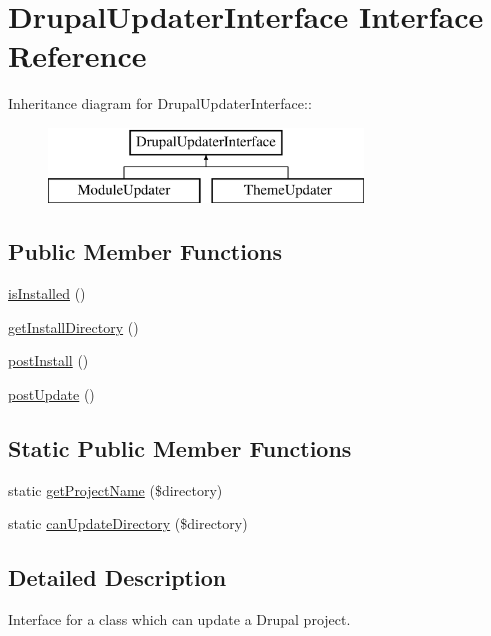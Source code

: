 \hypertarget{interfaceDrupalUpdaterInterface}{
\section{DrupalUpdaterInterface Interface Reference}
\label{interfaceDrupalUpdaterInterface}
}
Inheritance diagram for DrupalUpdaterInterface::\begin{figure}[H]
\begin{center}
\leavevmode
\includegraphics[height=2cm]{interfaceDrupalUpdaterInterface}
\end{center}
\end{figure}
\subsection*{Public Member Functions}
\begin{DoxyCompactItemize}
\item 
\hyperlink{interfaceDrupalUpdaterInterface_af4e78762c89a91a4a2a7dd2fb325f214}{isInstalled} ()
\item 
\hyperlink{interfaceDrupalUpdaterInterface_a2d619c7d5c0e869f13651543587419f1}{getInstallDirectory} ()
\item 
\hyperlink{interfaceDrupalUpdaterInterface_a392c2cdc12736286a18ec819732f9156}{postInstall} ()
\item 
\hyperlink{interfaceDrupalUpdaterInterface_a1790c6a7add39fa1265ab37bcd2a7f94}{postUpdate} ()
\end{DoxyCompactItemize}
\subsection*{Static Public Member Functions}
\begin{DoxyCompactItemize}
\item 
static \hyperlink{interfaceDrupalUpdaterInterface_ae60c2f028890fd7f9d5831f9058c9b33}{getProjectName} (\$directory)
\item 
static \hyperlink{interfaceDrupalUpdaterInterface_a3ff6c92f6ed593e03f5e36788ef2d2cc}{canUpdateDirectory} (\$directory)
\end{DoxyCompactItemize}


\subsection{Detailed Description}
Interface for a class which can update a Drupal project.

